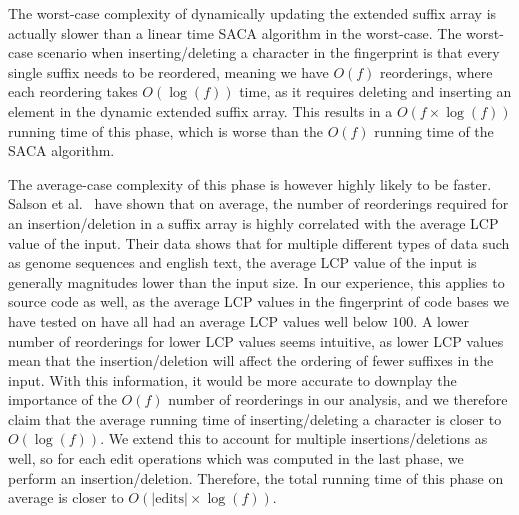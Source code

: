 The worst-case complexity of dynamically updating the extended suffix array is actually
slower than a linear time SACA algorithm in the worst-case. The worst-case scenario when
inserting/deleting a character in the fingerprint is that every single suffix needs to be
reordered, meaning we have $O(f)$ reorderings, where each reordering takes $O(\log(f))$
time, as it requires deleting and inserting an element in the dynamic extended suffix
array. This results in a $O(f \times \log(f))$ running time of this phase, which is worse
than the $O(f)$ running time of the SACA algorithm.

The average-case complexity of this phase is however highly likely to be faster. Salson et
al.~\cite{DynamicExtendedSuffixArraysReorderings} have shown that on average, the number
of reorderings required for an insertion/deletion in a suffix array is highly correlated
with the average LCP value of the input. Their data shows that for multiple different
types of data such as genome sequences and english text, the average LCP value of the
input is generally magnitudes lower than the input size. In our experience, this applies
to source code as well, as the average LCP values in the fingerprint of code bases we have
tested on have all had an average LCP values well below $100$. A lower number of
reorderings for lower LCP values seems intuitive, as lower LCP values mean that the
insertion/deletion will affect the ordering of fewer suffixes in the input. With this
information, it would be more accurate to downplay the importance of the $O(f)$ number of
reorderings in our analysis, and we therefore claim that the average running time of
inserting/deleting a character is closer to $O(\log(f))$. We extend this to account for
multiple insertions/deletions as well, so for each edit operations which was computed in
the last phase, we perform an insertion/deletion. Therefore, the total running time of
this phase on average is closer to $O(\vert\text{edits}\vert \times \log(f))$.



